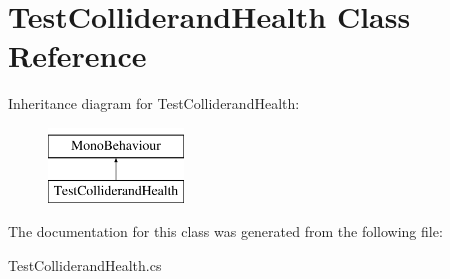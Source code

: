 \hypertarget{classTestColliderandHealth}{\section{Test\-Colliderand\-Health Class Reference}
\label{classTestColliderandHealth}
}
Inheritance diagram for Test\-Colliderand\-Health\-:\begin{figure}[H]
\begin{center}
\leavevmode
\includegraphics[height=2.000000cm]{classTestColliderandHealth}
\end{center}
\end{figure}


The documentation for this class was generated from the following file\-:\begin{DoxyCompactItemize}
\item 
Test\-Colliderand\-Health.\-cs\end{DoxyCompactItemize}
